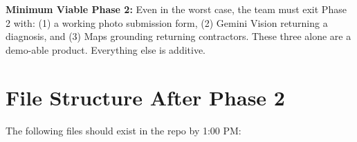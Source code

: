 \documentclass[11pt, a4paper]{article}
\begin{document}
\begin{successbox}
\textbf{Minimum Viable Phase 2:} Even in the worst case, the team must exit Phase 2 with: (1) a working photo submission form, (2) Gemini Vision returning a diagnosis, and (3) Maps grounding returning contractors. These three alone are a demo-able product. Everything else is additive.
\end{successbox}

\vspace{1em}

\section{File Structure After Phase 2}

The following files should exist in the repo by 1:00 PM:
\end{document}
